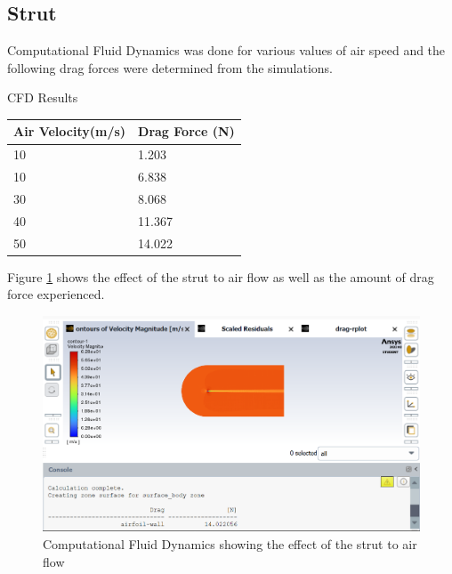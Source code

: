 \subsection{Strut}
Computational Fluid Dynamics was done for various values of air speed and the following drag forces were
determined from the simulations.
\begin{table}[H]
	\caption{CFD Results}
	\end{table}
	\begin{center}
	\begin{tabular}{|l|l|}
	\hline
	\textbf{Air Velocity(m/s)} & \textbf{Drag Force (N)}\\
	\hline
	10 & 1.203 \\
	\hline
	10 & 6.838 \\
	\hline
	30 & 8.068 \\
	\hline
	40 & 11.367 \\
	\hline
	50 & 14.022 \\
	\hline
	\end{tabular}
\end{center}
Figure \ref{cfd} shows the effect of the strut to air flow as well as the amount of drag force experienced.
\begin{center}
	\begin{figure}[H]
		\centering
		\includegraphics[width=0.6\linewidth]{Figures/CFD.png}
		\caption[CFD]{Computational Fluid Dynamics showing the effect of the strut to air flow}
		\label{cfd}
	\end{figure}
\end{center}

